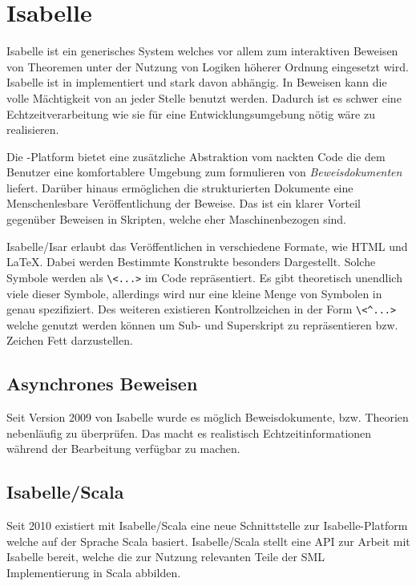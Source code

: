 \section{Isabelle}

Isabelle ist ein generisches System welches vor allem zum interaktiven Beweisen von Theoremen unter
der Nutzung von Logiken höherer Ordnung eingesetzt wird. Isabelle ist in  implementiert und
stark davon abhängig. In Beweisen kann die volle Mächtigkeit von  an jeder Stelle benutzt
werden. Dadurch ist es schwer eine Echtzeitverarbeitung wie sie für eine Entwicklungsumgebung nötig
wäre zu realisieren. \cite{isabelle}

Die -Platform bietet eine zusätzliche Abstraktion vom nackten  Code die dem
Benutzer eine komfortablere Umgebung zum formulieren von \textit{Beweisdokumenten} liefert. Darüber
hinaus ermöglichen die  strukturierten Dokumente eine Menschenlesbare Veröffentlichung der Beweise.
Das ist ein klarer Vorteil gegenüber Beweisen in  Skripten, welche eher Maschinenbezogen
sind.

Isabelle/Isar erlaubt das Veröffentlichen in verschiedene Formate, wie HTML und LaTeX. Dabei werden
Bestimmte Konstrukte besonders Dargestellt. Solche Symbole werden als
\texttt{\textbackslash\textless ...\textgreater} im Code repräsentiert. Es gibt theoretisch
unendlich viele dieser Symbole, allerdings wird nur eine kleine Menge von Symbolen in
\cite{isabelle} genau spezifiziert. Des weiteren existieren Kontrollzeichen in der Form
\texttt{\textbackslash\textless\textasciicircum ...\textgreater} welche genutzt werden können um
Sub- und Superskript zu repräsentieren bzw. Zeichen Fett darzustellen.

\subsection{Asynchrones Beweisen}

Seit Version 2009 von Isabelle wurde es möglich Beweisdokumente, bzw. Theorien nebenläufig zu
überprüfen. Das macht es realistisch Echtzeitinformationen während der Bearbeitung verfügbar zu
machen. \cite{parproof} 

\subsection{Isabelle/Scala}

Seit 2010 existiert mit Isabelle/Scala eine neue Schnittstelle zur Isabelle-Platform welche auf der
Sprache Scala basiert. Isabelle/Scala stellt eine API zur Arbeit mit Isabelle bereit, welche die zur
Nutzung relevanten Teile der SML Implementierung in Scala abbilden. \cite{iscala}

